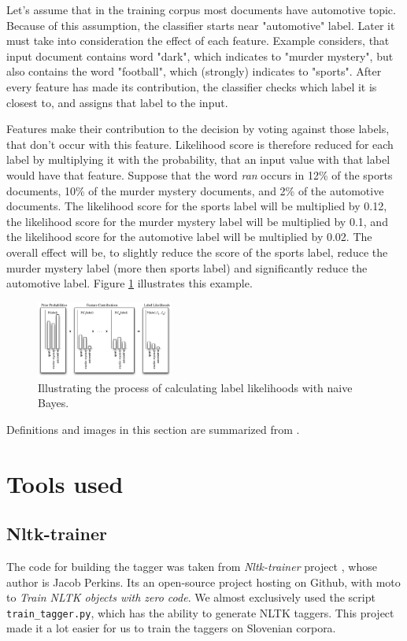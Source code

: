\documentclass[10pt, conference, compsocconf]{IEEEtran}
\begin{document}
Let's assume that in the training corpus most documents have automotive topic. Because of this assumption, the classifier starts near "automotive" label. Later it must take into consideration the effect of each feature. Example considers, that input document contains word "dark", which indicates to "murder mystery", but also contains the word "football", which (strongly) indicates to "sports". After every feature has made its contribution, the classifier checks which label it is closest to, and assigns that label to the input.

Features make their contribution to the decision by voting against those labels, that don't occur with this feature. Likelihood score is therefore reduced for each label by multiplying it with the probability, that an input value with that label would have that feature. Suppose that the word \textit{ran} occurs in  12\% of the sports documents, 10\% of the murder mystery documents, and 2\% of the automotive documents. The likelihood score for the sports label will be multiplied by 0.12, the likelihood score for the murder mystery label will be multiplied by 0.1, and the likelihood score for the automotive label will be multiplied by 0.02. The overall effect will be, to slightly reduce the score of the sports label, reduce the murder mystery label (more then sports label) and significantly reduce the automotive label. Figure \ref{fig:naive-bayes-bargraph} illustrates this example.

\begin{figure}[htb]
\begin{center}
\includegraphics[width=0.4\textwidth]{naive_bayes_bargraph.png} 
\end{center}
\caption{Illustrating the process of calculating label likelihoods with naive Bayes.}
\label{fig:naive-bayes-bargraph}
\end{figure}

Definitions and images in this section are summarized from \cite{NLTKBOOK}.
\section{Tools used}
\label{toolsUsed}
\subsection{Nltk-trainer} %
The code for building the tagger was taken from \textit{Nltk-trainer}  project \cite{nltk-trainer}, whose author is Jacob Perkins.
Its an open-source project hosting on Github, with moto to \textit{Train NLTK objects with zero code}.
We almost exclusively used the script \texttt{train\_tagger.py}, which has the ability to generate NLTK taggers. This project made it a lot easier for us to train the taggers on Slovenian corpora.
\end{document}
